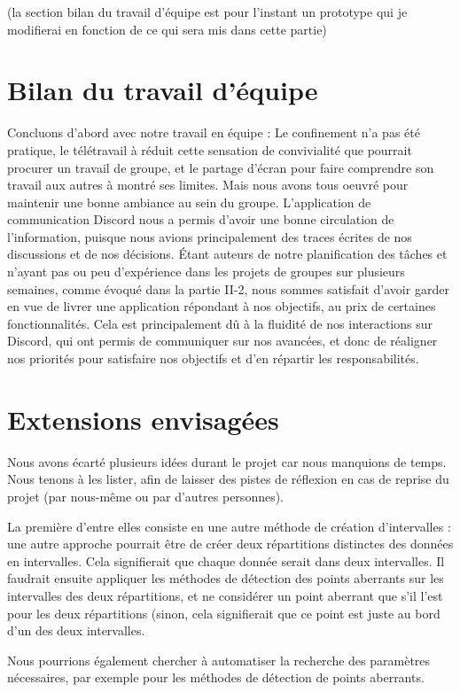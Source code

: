 \documentclass[a4paper,12pt]{article} %
\begin{document}
    (la section bilan du travail d'équipe est pour l'instant un prototype qui je  modifierai en fonction de ce qui sera mis dans cette partie)
    
	\section{Bilan du travail d'équipe}
	Concluons d'abord avec notre travail en équipe :
	Le confinement n'a pas été pratique, le télétravail à réduit cette sensation de convivialité que pourrait procurer un travail de groupe, et le partage d'écran pour faire comprendre son travail aux autres à montré ses limites. Mais nous avons tous oeuvré pour maintenir une bonne ambiance au sein du groupe. 
	L'application de communication Discord nous a permis d'avoir une bonne circulation de l'information, puisque nous avions principalement des traces écrites de nos discussions et de nos décisions. 
    Étant auteurs de notre planification des tâches et n'ayant pas ou peu d'expérience dans les projets de groupes sur plusieurs semaines, comme évoqué dans la partie II-2, nous sommes satisfait d'avoir garder en vue de livrer une application répondant à nos objectifs, au prix de certaines fonctionnalités. Cela est  principalement dû à la fluidité de nos interactions sur Discord, qui ont permis de communiquer sur nos avancées, et donc de réaligner nos priorités pour satisfaire nos objectifs et d'en répartir les responsabilités. 
    
    \section{Extensions envisagées}
    Nous avons écarté plusieurs idées durant le projet car nous manquions de temps. Nous tenons à les lister, afin de laisser des pistes de réflexion en cas de reprise du projet (par nous-même ou par d'autres personnes).
    
    La première d'entre elles consiste en une autre méthode de création d'intervalles : une autre approche pourrait être de créer deux répartitions distinctes des données en intervalles. Cela signifierait que chaque donnée serait dans deux intervalles. Il faudrait ensuite appliquer les méthodes de détection des points aberrants sur les intervalles des deux répartitions, et ne considérer un point aberrant que s'il l'est pour les deux répartitions (sinon, cela signifierait que ce point est juste au bord d'un des deux intervalles.
    
    Nous pourrions également chercher à automatiser la recherche des paramètres nécessaires, par exemple pour les méthodes de détection de points aberrants.
    
\end{document}
